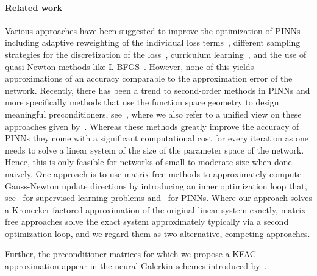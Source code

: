 \paragraph{Related work}
Various approaches have been suggested to improve the optimization of PINNs including adaptive reweighting of the individual loss terms~\citep{wang2021understanding,van2022optimally,wang2022and}, different sampling strategies for the discretization of the loss~\citep{lu2021deepxde, nabian2021efficient, daw2022rethinking,zapf2022investigating, wang2022respecting, wu2023comprehensive}, curriculum learning~\citep{krishnapriyan2021characterizing, wang2022respecting}, and the use of quasi-Newton methods like L-BFGS~\citep{markidis2021old}.
However, none of this yields approximations of an accuracy comparable to the approximation error of the network.
Recently, there has been a trend to second-order methods in PINNs and more specifically methods that use the function space geometry to design meaningful preconditioners, see~\cite{zeng2022competitive, muller2023achieving, de2023operator, liu2024preconditioning, jnini2024gauss,chen2024teng, zampini2024petscml}, where we also refer to a unified view on these approaches given by~\cite{muller2024optimization}.
Whereas these methods greatly improve the accuracy of PINNs they come with a significant computational cost for every iteration as one needs to solve a linear system of the size of the parameter space of the network.
Hence, this is only feasible for networks of small to moderate size when done naively.
One approach is to use matrix-free methods to approximately compute Gauss-Newton update directions by introducing an inner optimization loop that, see~\cite{schraudolph2002fast,martens2010deep} for supervised learning problems and~\cite{zeng2022competitive,bonfanti2024challenges, jnini2024gauss,zampini2024petscml} for PINNs.
Where our approach solves a Kronecker-factored approximation of the original linear system exactly, matrix-free approaches solve the exact system approximately typically via a second optimization loop, and we regard them as two alternative, competing approaches. %

Further, the preconditioner matrices for which we propose a KFAC approximation appear in the neural Galerkin schemes introduced by~\cite{bruna2024neural}.

